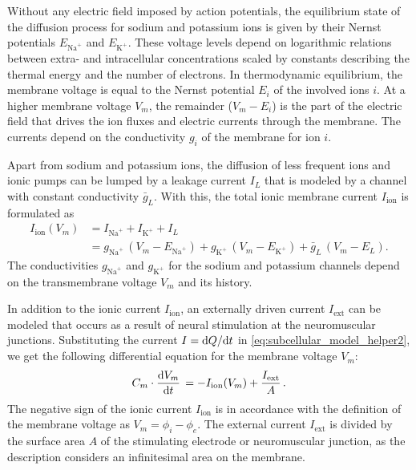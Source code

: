 Without any electric field imposed by action potentials, the equilibrium state of the diffusion process for sodium and potassium ions is given by their Nernst potentials $E_{\text{Na}^{+}}$ and $E_{\text{K}^{+}}$. These voltage levels depend on logarithmic relations between extra- and intracellular concentrations scaled by constants describing the thermal energy and the number of electrons.
In thermodynamic equilibrium, the membrane voltage is equal to the Nernst potential $E_i$ of the involved ions $i$. 
At a higher membrane voltage $V_m$, the remainder ($V_m - E_i$) is the part of the electric field that drives the
ion fluxes and electric currents through the membrane. The currents depend on the conductivity $g_i$ of
the membrane for ion $i$. 

Apart from sodium and potassium ions, the diffusion of less frequent ions and ionic pumps can be lumped by a leakage current $I_L$ that is modeled by a channel with constant conductivity $\bar{g}_L$.
With this, the total ionic membrane current $I_\text{ion}$ is formulated as
%
\begin{subequations}
\begin{align}\label{eq:subcellular_model_helper4}
  I_\text{ion}(V_m)  &= I_{\text{Na}^{+}} + I_{\text{K}^{+}} + I_L \\
  & = g_{\text{Na}^{+}}\,(V_m - E_{\text{Na}^{+}}) + g_{\text{K}^{+}}\,(V_m - E_{\text{K}^{+}}) + \bar{g}_L\,(V_m - E_L). \label{eq:subcellular_model_helper5}
\end{align}
\end{subequations}
%
The conductivities $g_{\text{Na}^{+}}$ and $g_{\text{K}^{+}}$ for the sodium and potassium channels depend on the transmembrane voltage $V_m$ and its history.

In addition to the ionic current $I_\text{ion}$, an externally driven current $I_\text{ext}$ can be modeled that occurs as a result of neural stimulation at the neuromuscular junctions. Substituting the current $I=\d Q / \d t$ in \cref{eq:subcellular_model_helper2}, we get the following differential equation for the membrane voltage $V_m$:
\begin{align}\label{eq:subcellular_model_helper3}
  C_m \cdot \d{V_m}{t} = -I_\text{ion}(V_m) + \dfrac{I_\text{ext}}{A}.
\end{align}
%
The negative sign of the ionic current $I_\text{ion}$ is in accordance with the definition of the membrane voltage as $V_m=\phi_i-\phi_e$. The external current $I_\text{ext}$ is divided by the surface area $A$ of the stimulating electrode or neuromuscular junction, as the description considers an infinitesimal area on the membrane.

